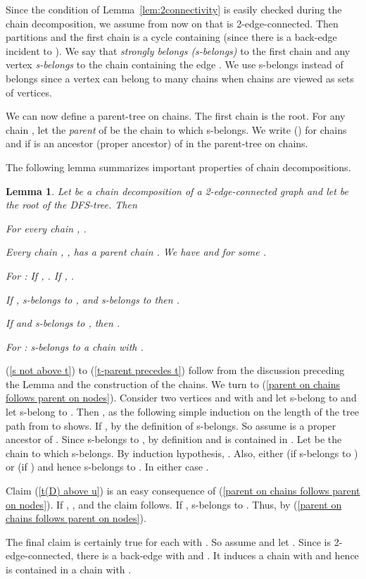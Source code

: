 \documentclass[paper=a4]{scrartcl}
\newtheorem{lemma}{Lemma}
\newcommand{\qed}{}
\newcommand{\mqed}{\hfill}
\newlength{\proofpostskipamount}\newlength{\proofpreskipamount}
\newenvironment{proof}{\par\vspace{\proofpreskipamount}\noindent{\textbf{Proof:}}\hspace{0.5em}}{\nopagebreak \strut\nopagebreak \hspace{\fill}\mqed\par\vspace{\proofpostskipamount}\noindent}
\begin{document}
Since the condition of Lemma~\ref{lem:2connectivity} is easily checked during the chain decomposition, we assume from now on that  is 2-edge-connected. Then  partitions  and the first chain  is a cycle containing  (since there is a back-edge incident to ). We say that  \emph{strongly belongs (s-belongs)} to the first chain and any vertex  \emph{s-belongs} to the chain containing the edge . We use s-belongs instead of belongs since a vertex can belong to many chains when chains are viewed as sets of vertices.

We can now define a parent-tree on chains. The first chain  is the root. For any chain , let the \emph{parent}  of  be the chain to which  s-belongs. We write  () for chains  and  if  is an ancestor (proper ancestor) of  in the parent-tree on chains.

The following lemma summarizes important properties of chain decompositions.

\begin{lemma}\label{facts about chain decomposition}
Let  be a chain decomposition of a 2-edge-connected graph  and let  be the root of the DFS-tree. Then
\begin{compactenum}[(1)]
\item \label{s not above t} For every chain , .
\item \label{properties of parent chain} Every chain , , has a parent chain . We have  and  for some .
\item \label{t-parent precedes t} For : If , . If , .
\item \label{parent on chains follows parent on nodes} If ,  s-belongs to , and  s-belongs to  then .
\item \label{t(D) above u} If  and  s-belongs to , then .
\item \label{s(C) s-belongs to earlier chain} For :  s-belongs to a chain  with .
\end{compactenum}
\end{lemma}
\begin{proof}
(\ref{s not above t}) to (\ref{t-parent precedes t}) follow from the discussion preceding the Lemma and the construction of the chains. We turn to (\ref{parent on chains follows parent on nodes}). Consider two vertices  and  with  and let  s-belong to  and let  s-belong to . Then , as the following simple induction on the length of the tree path from  to  shows. If ,  by the definition of s-belongs. So assume  is a proper ancestor of . Since  s-belongs to , by definition  and  is contained in . Let  be the chain to which  s-belongs. By induction hypothesis, . Also, either  (if  s-belongs to ) or  (if ) and hence  s-belongs to . In either case .

Claim (\ref{t(D) above u}) is an easy consequence of (\ref{parent on chains follows parent on nodes}). If , , and the claim follows. If ,  s-belongs to . Thus,  by  (\ref{parent on chains follows parent on nodes}).

The final claim is certainly true for each  with . So assume  and let . Since  is 2-edge-connected, there is a back-edge  with  and . It induces a chain  with  and hence  is contained in a chain  with . \qed
\end{proof}
\end{document}
